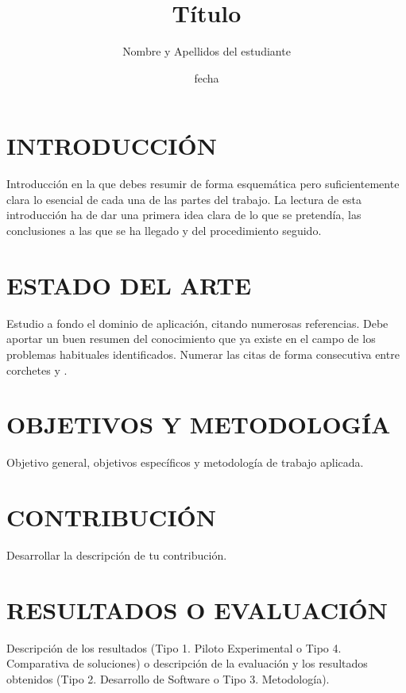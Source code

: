 \documentclass[11pt,a4paper,english,twocolumn]{article}
\title{Título}
\author{Nombre y Apellidos del estudiante}
\date{fecha}
\begin{document}
\twocolumn[
\begin{@twocolumnfalse}
\maketitle
\end{@twocolumnfalse}
]




\section{INTRODUCCIÓN}
Introducción en la que debes resumir de forma esquemática pero suficientemente clara lo esencial de cada una de las partes del trabajo.
La lectura de esta introducción ha de dar una primera idea clara de lo que se pretendía, las conclusiones a las que se ha llegado y del procedimiento seguido.

\section{ESTADO DEL ARTE}
Estudio a fondo el dominio de aplicación, citando numerosas referencias.
Debe aportar un buen resumen del conocimiento que ya existe en el campo de los problemas habituales identificados.
Numerar las citas de forma consecutiva entre corchetes \cite{Chen} y \cite{young}.
\section{OBJETIVOS Y METODOLOGÍA}
Objetivo general, objetivos específicos y metodología de trabajo aplicada.

\section{CONTRIBUCIÓN}
Desarrollar la descripción de tu contribución.

\section{RESULTADOS O EVALUACIÓN }
Descripción de los resultados (Tipo 1. Piloto Experimental o Tipo 4. Comparativa de soluciones) o descripción de la evaluación y los resultados obtenidos (Tipo 2. Desarrollo de Software o Tipo 3. Metodología).
\end{document}
